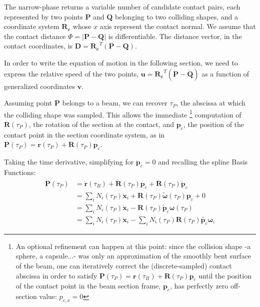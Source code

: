 \documentclass[review]{elsarticle}
\def\avect#1{{\boldsymbol{#1}}}
\def\amatr#1{{\boldsymbol{#1}}}
\begin{document}
The narrow-phase returns a variable number of candidate contact pairs, each represented by two points $\avect{P}$ and $\avect{Q}$ belonging to two colliding shapes, and a coordinate system $\amatr{R_c}$ whose $x$ axis represent the contact normal. We assume that the contact distance $\Phi=|\avect{P}-\avect{Q}|$ is differentiable. The distance vector, in the contact coordinates, is $\avect{D}=\amatr{R_c}^T(\avect{P}-\avect{Q})$.

In order to write the equation of motion in the following section, we need to express the relative speed of the two points, $\avect{u}=\amatr{R_c}^T(\dot{\avect{P}}-\dot{\avect{Q}})$ as a function of generalized coordinates $\avect{v}$.

Assuming point $\avect{P}$ belongs to a beam, we can recover $\tau_P$, the abscissa at which the colliding shape was sampled.
This allows the immediate 
\footnote{An optional refinement can happen at this point: since the collision shape -a sphere, a capsule...- was only an approximation of the smoothly bent surface of the beam, one can iteratively correct the (discrete-sampled) contact abscissa in order to satisfy $\avect{P}(\tau_P)=\avect{r}(\tau_B)+\amatr{R}(\tau_P)\avect{p}_{c}$ until the position of the contact point in the beam section frame, $\avect{p}_{c}$, has perfectly zero off-section value: $p_{c,x}=0$}
computation of $\amatr{R}(\tau_P)$, the rotation of the section at the contact, and $\avect{p}_{c}$, the position of the contact point in the section coordinate system, as in $\avect{P}(\tau_P)=\avect{r}(\tau_P)+\amatr{R}(\tau_P)\avect{p}_{c}$.

Taking the time derivative, simplifying for $\dot{\avect{p}}_c=0$ and recalling the spline Basis Functions:
%
\begin{subequations}
\begin{align}
\dot{\avect{P}}(\tau_P) &=
 \dot{\avect{r}}(\tau_B) +
 \dot{\amatr{R}}(\tau_P) \avect{p}_c +
 \amatr{R}(\tau_P) \dot{\avect{p}}_c \\
 &=\sum_i{N_i(\tau_P)\dot{\avect{x}}_i } +
  \amatr{R}(\tau_P) \tilde{\avect{\omega}}(\tau_P) \avect{p}_{c} + 0 \\
 &=\sum_i{N_i(\tau_P)\dot{\avect{x}}_i } 
  -\amatr{R}(\tau_P) \tilde{\avect{p}}_{c} \avect{\omega}(\tau_P) \\
 &=\sum_i{N_i(\tau_P)\dot{\avect{x}}_i } -
  \sum_i{N_i(\tau_P)\amatr{R}(\tau_P) \tilde{\avect{p}_{c}} \avect{\omega}_{i}} \label{eq:jaco}
\end{align}
\end{subequations}
\end{document}
